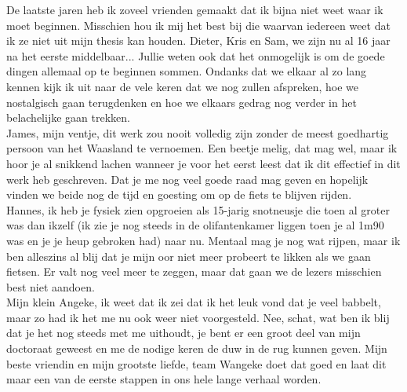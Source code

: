 \begin{large}
\noindent De laatste jaren heb ik zoveel vrienden gemaakt dat ik bijna niet weet waar ik moet beginnen. Misschien hou ik mij het best bij die waarvan iedereen weet dat ik ze niet uit mijn thesis kan houden. Dieter, Kris en Sam, we zijn nu al 16 jaar na het eerste middelbaar... Jullie weten ook dat het onmogelijk is om de goede dingen allemaal op te beginnen sommen. Ondanks dat we elkaar al zo lang kennen kijk ik uit naar de vele keren dat we nog zullen afspreken, hoe we nostalgisch gaan terugdenken en hoe we elkaars gedrag nog verder in het belachelijke gaan trekken.\\

\noindent James, mijn ventje, dit werk zou nooit volledig zijn zonder de meest goedhartig persoon van het Waasland te vernoemen. Een beetje melig, dat mag wel, maar ik hoor je al snikkend lachen wanneer je voor het eerst leest dat ik dit effectief in dit werk heb geschreven. Dat je me nog veel goede raad mag geven en hopelijk vinden we beide nog de tijd en goesting om op de fiets te blijven rijden.\\

\noindent Hannes, ik heb je fysiek zien opgroeien als 15-jarig snotneusje die toen al groter was dan ikzelf (ik zie je nog steeds in de olifantenkamer liggen toen je al 1m90 was en je je heup gebroken had) naar nu. Mentaal mag je nog wat rijpen, maar ik ben alleszins al blij dat je mijn oor niet meer probeert te likken als we gaan fietsen. Er valt nog veel meer te zeggen, maar dat gaan we de lezers misschien best niet aandoen.\\

\noindent Mijn klein Angeke, ik weet dat ik zei dat ik het leuk vond dat je veel babbelt, maar zo had ik het me nu ook weer niet voorgesteld. Nee, schat, wat ben ik blij dat je het nog steeds met me uithoudt, je bent er een groot deel van mijn doctoraat geweest en me de nodige keren de duw in de rug kunnen geven. Mijn beste vriendin en mijn grootste liefde, team Wangeke doet dat goed en laat dit maar een van de eerste stappen in ons hele lange verhaal worden.

\end{large}

~\vfill

\newpage
